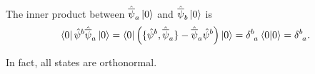 \begin{example}[]
  The inner product between $\hat{\overline{\psi}}_{a} \ket{0}$ and $\hat{\overline{\psi}}_{b} \ket{0}$ is
  \begin{equation}
    \bra{0} \hat{\psi}^{b} \hat{\overline{\psi}}_{a} \ket{0} = \bra{0} \left( \{\hat{\psi}^{b}, \hat{\overline{\psi}}_{a}\} - \hat{\overline{\psi}}_{a} \hat{\psi}^{b} \right) \ket{0} = \delta\indices{^{b}_{a}} \braket{0} = \delta\indices{^{b}_{a}}.
  \end{equation}
\end{example}
In fact, all states are orthonormal.
